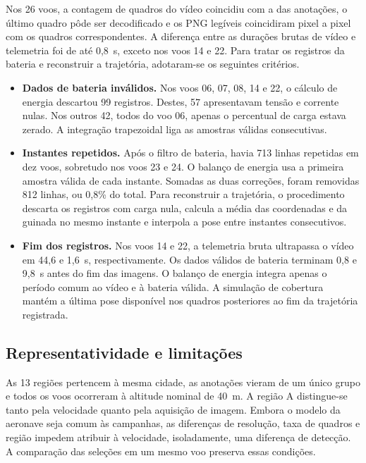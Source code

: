 Nos 26 voos, a contagem de quadros do vídeo coincidiu com a das anotações, o último quadro pôde ser decodificado e os PNG legíveis coincidiram pixel a pixel com os quadros correspondentes. A diferença entre as durações brutas de vídeo e telemetria foi de até 0,8~s, exceto nos voos 14 e 22. Para tratar os registros da bateria e reconstruir a trajetória, adotaram-se os seguintes critérios.
\begin{itemize}
  \item \textbf{Dados de bateria inválidos.} Nos voos 06, 07, 08, 14 e 22, o cálculo de energia descartou 99 registros. Destes, 57 apresentavam tensão e corrente nulas. Nos outros 42, todos do voo 06, apenas o percentual de carga estava zerado. A integração trapezoidal liga as amostras válidas consecutivas.
  \item \textbf{Instantes repetidos.} Após o filtro de bateria, havia 713 linhas repetidas em dez voos, sobretudo nos voos 23 e 24. O balanço de energia usa a primeira amostra válida de cada instante. Somadas as duas correções, foram removidas 812 linhas, ou 0,8\% do total. Para reconstruir a trajetória, o procedimento descarta os registros com carga nula, calcula a média das coordenadas e da guinada no mesmo instante e interpola a pose entre instantes consecutivos.
  \item \textbf{Fim dos registros.} Nos voos 14 e 22, a telemetria bruta ultrapassa o vídeo em 44,6 e 1,6~s, respectivamente. Os dados válidos de bateria terminam 0,8 e 9,8~s antes do fim das imagens. O balanço de energia integra apenas o período comum ao vídeo e à bateria válida. A simulação de cobertura mantém a última pose disponível nos quadros posteriores ao fim da trajetória registrada.
\end{itemize}

\subsection{Representatividade e limitações}
\label{sec_base_limitacoes}

As 13 regiões pertencem à mesma cidade, as anotações vieram de um único grupo e todos os voos ocorreram à altitude nominal de 40~m. A região A distingue-se tanto pela velocidade quanto pela aquisição de imagem. Embora o modelo da aeronave seja comum às campanhas, as diferenças de resolução, taxa de quadros e região impedem atribuir à velocidade, isoladamente, uma diferença de detecção. A comparação das seleções em um mesmo voo preserva essas condições.

